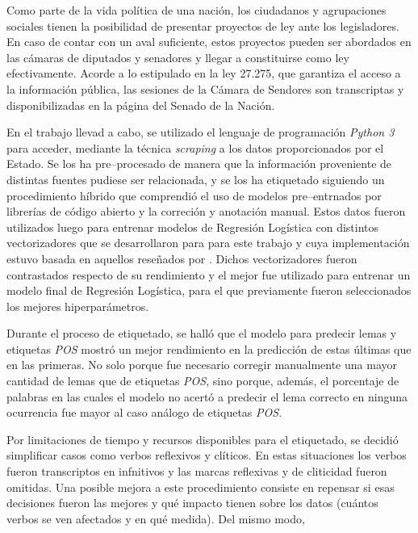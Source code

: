 Como parte de la vida pol\'itica de una naci\'on, los ciudadanos y
agrupaciones sociales tienen la posibilidad de presentar proyectos
de ley ante los legisladores. En caso de contar con un aval suficiente,
estos proyectos pueden ser abordados en las c\'amaras de diputados
y senadores y llegar a constituirse como ley efectivamente.
Acorde a lo estipulado en la ley 27.275, que garantiza el acceso a la
informaci\'on p\'ublica, las sesiones de la C\'amara de Sendores son
transcriptas y disponibilizadas en la p\'agina del Senado de la Naci\'on.
\par
En el trabajo llevad a cabo, se utilizado el lenguaje de
programaci\'on \textit{Python 3} para acceder, mediante la t\'ecnica
\textit{scraping} a los datos proporcionados por el Estado. Se los ha
pre{--}procesado de manera que la informaci\'on proveniente de
distintas fuentes pudiese ser relacionada, y se los ha etiquetado
siguiendo un procedimiento h\'ibrido que comprendi\'o el uso de modelos
pre{--}entrnados por librer\'ias de c\'odigo abierto y la correci\'on y
anotaci\'on manual. Estos datos fueron utilizados luego para entrenar modelos
de Regresi\'on Log\'istica con distintos vectorizadores que se desarrollaron
para para este trabajo y cuya implementaci\'on estuvo basada en aquellos
reseñados por \cite{monroe2008fightin}. Dichos vectorizadores fueron
contrastados respecto de su rendimiento y el mejor fue utilizado para entrenar
un modelo final de Regresi\'on Log\'istica, para el que previamente fueron
seleccionados los mejores hiperpar\'ametros.
\par
Durante el proceso de etiquetado, se hall\'o que el modelo para
predecir lemas y etiquetas \textit{POS} mostr\'o un mejor rendimiento
en la predicci\'on de estas \'ultimas que en las primeras. No solo
porque fue necesario corregir manualmente una mayor cantidad de lemas
que de etiquetas \textit{POS}, sino porque, adem\'as, el porcentaje
de palabras en las cuales el modelo no acert\'o a predecir el lema
correcto en ninguna ocurrencia fue mayor al caso an\'alogo de etiquetas
\textit{POS}. 
\par
Por limitaciones de tiempo y recursos disponibles para el etiquetado,
se decidi\'o simplificar casos como verbos reflexivos y cl\'iticos. En
estas situaciones los verbos fueron transcriptos en infnitivos y las
marcas reflexivas y de cliticidad fueron omitidas.
Una posible mejora a este procedimiento consiste en repensar si esas
decisiones fueron las mejores y qu\'e impacto tienen sobre los datos
(cu\'antos verbos se ven afectados y en qu\'e medida). Del mismo modo,

